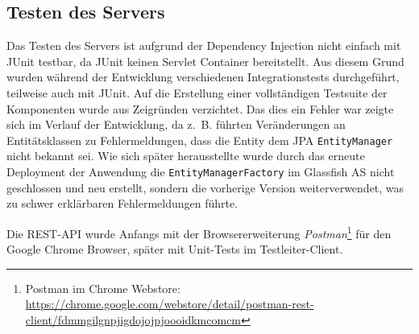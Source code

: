 \subsection{Testen des Servers}
Das Testen des Servers ist aufgrund der Dependency Injection nicht einfach mit JUnit testbar, da JUnit keinen Servlet Container bereitstellt.
Aus diesem Grund wurden während der Entwicklung verschiedenen Integrationstests durchgeführt, teilweise auch mit JUnit.
Auf die Erstellung einer vollständigen Testsuite der Komponenten wurde aus Zeigründen verzichtet.
Das dies ein Fehler war zeigte sich im Verlauf der Entwicklung, da z.~B. führten Veränderungen an Entitätsklassen zu Fehlermeldungen, dass die Entity dem \ac{JPA} \texttt{EntityManager} nicht bekannt sei.
Wie sich später herausstellte wurde durch das erneute Deployment der Anwendung die \texttt{EntityManagerFactory} im Glassfish \ac{AS} nicht geschlossen und neu erstellt, sondern die vorherige Version weiterverwendet, was zu schwer erklärbaren Fehlermeldungen führte.

Die \ac{REST}-\ac{API} wurde Anfangs mit der Browsererweiterung \emph{Postman}\footnote{Postman im Chrome Webstore: \url{https://chrome.google.com/webstore/detail/postman-rest-client/fdmmgilgnpjigdojojpjoooidkmcomcm}} für den Google Chrome Browser, später mit Unit-Tests im Testleiter-Client. 